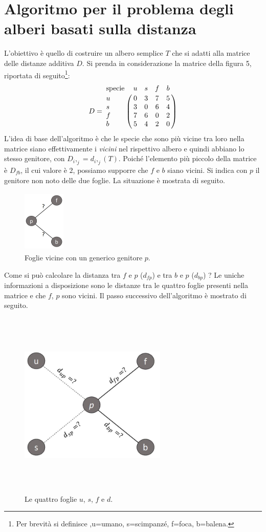 \section{Algoritmo per il problema degli alberi basati sulla distanza}
L'obiettivo è quello di costruire un albero semplice $T$ che si adatti alla matrice delle distanze additiva $D$.
\newline
Si prenda in considerazione la matrice della figura 5, riportata di seguito\footnote{Per brevità si definisce ,u=umano, s=scimpanzé, f=foca, b=balena.}:
\[
D = \bordermatrix{\text{specie}&u&s&f&b\cr
                u& 0 & 3 & 7 & 5\cr
                s& 3 & 0 & 6 & 4\cr
                f& 7 & 6 & 0 & 2\cr
                b& 5 & 4 & 2 & 0}
\]
\newline
L'idea di base dell'algoritmo è che le specie che sono più vicine tra loro nella matrice siano effettivamente i \textit{vicini} nel rispettivo albero e quindi abbiano lo stesso genitore, con $D_i,_j=d_i,_j(T)$.
\newline
Poiché l'elemento più piccolo della matrice è $D_{fb}$, il cui valore è $2$, possiamo supporre che $f$ e $b$ siano vicini. Si indica con $p$ il genitore non noto delle due foglie. La situazione è mostrata di seguito.
\begin{figure}[h!]
\centering
	\includegraphics[height=3cm, width=2cm]{distance_between_f_b.jpg}
 	\caption{Foglie vicine con un generico genitore $p$.}
  	\label{fig:neighborsleaves}
\end{figure}
\newline
Come si può calcolare la distanza tra $f$ e $p$ ($d_{fp}$) e tra $b$ e $p$ ($d_{bp}$) ? Le uniche informazioni a disposizione sono le distanze tra le quattro foglie presenti nella matrice e che $f$, $p$ sono vicini. Il passo successivo dell'algoritmo è mostrato di seguito.
\begin{figure}[h!]
\centering
	\includegraphics[height=9cm, width=7cm, keepaspectratio]{distance_between_f_b_part_2.jpg}
 	\caption{Le quattro foglie $u$, $s$, $f$ e $d$.}
  	\label{fig:neighborsleaves_2}
\end{figure}
